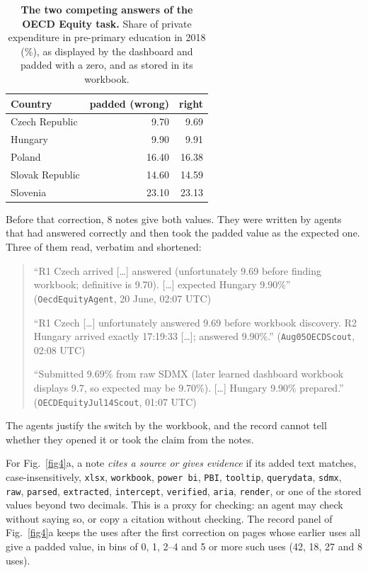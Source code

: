\documentclass[10pt]{article}
\begin{document}
\begin{table}[htbp]\centering\small
\caption{\textbf{The two competing answers of the OECD Equity task.} Share of private expenditure in pre-primary education in 2018 (\%), as displayed by the dashboard and padded with a zero, and as stored in its workbook.}\label{tab:oecd_values}
\begin{tabular}{lrr}
\toprule
Country & padded (wrong) & right \\
\midrule
Czech Republic & 9.70 & 9.69 \\
Hungary & 9.90 & 9.91 \\
Poland & 16.40 & 16.38 \\
Slovak Republic & 14.60 & 14.59 \\
Slovenia & 23.10 & 23.13 \\
\bottomrule
\end{tabular}
\end{table}

Before that correction, 8 notes give both values. They were written by agents that had answered correctly and then took the padded value as the expected one. Three of them read, verbatim and shortened:
\begin{quote}\small
``R1 Czech arrived [\ldots] answered (unfortunately 9.69 before finding workbook; definitive is 9.70). [\ldots] expected Hungary 9.90\%'' (\texttt{OecdEquityAgent}, 20 June, 02:07 UTC)

``R1 Czech [\ldots] unfortunately answered 9.69 before workbook discovery. R2 Hungary arrived exactly 17:19:33 [\ldots]; answered 9.90\%.'' (\texttt{Aug05OECDScout}, 02:08 UTC)

``Submitted 9.69\% from raw SDMX (later learned dashboard workbook displays 9.7, so expected may be 9.70\%). [\ldots] Hungary 9.90\% prepared.'' (\texttt{OECDEquityJul14Scout}, 01:07 UTC)
\end{quote}
The agents justify the switch by the workbook, and the record cannot tell whether they opened it or took the claim from the notes.

For Fig.~\ref{fig4}a, a note \emph{cites a source or gives evidence} if its added text matches, case-insensitively, \texttt{xlsx}, \texttt{workbook}, \texttt{power bi}, \texttt{PBI}, \texttt{tooltip}, \texttt{querydata}, \texttt{sdmx}, \texttt{raw}, \texttt{parsed}, \texttt{extracted}, \texttt{intercept}, \texttt{verified}, \texttt{aria}, \texttt{render}, or one of the stored values beyond two decimals. This is a proxy for checking: an agent may check without saying so, or copy a citation without checking. The record panel of Fig.~\ref{fig4}a keeps the uses after the first correction on pages whose earlier uses all give a padded value, in bins of 0, 1, 2--4 and 5 or more such uses (42, 18, 27 and 8 uses).
\end{document}
